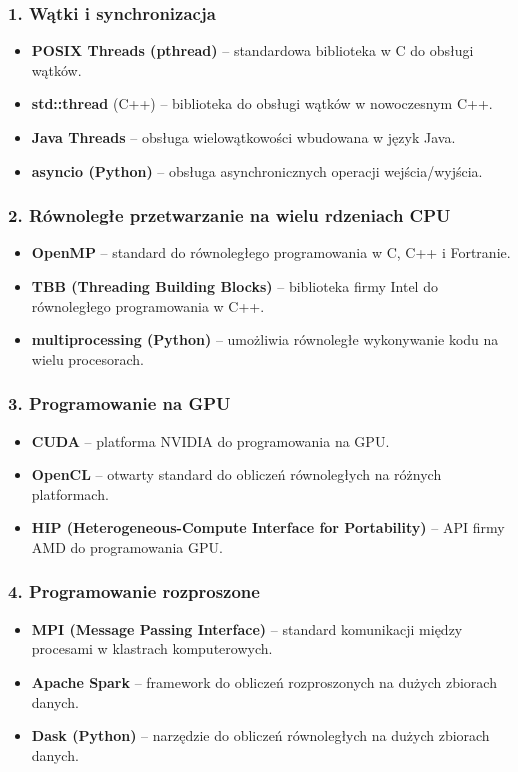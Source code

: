 \subsubsection{1. Wątki i synchronizacja}
\begin{itemize}
    \item \textbf{POSIX Threads (pthread)} – standardowa biblioteka w C do obsługi wątków.
    \item \textbf{std::thread} (C++) – biblioteka do obsługi wątków w nowoczesnym C++.
    \item \textbf{Java Threads} – obsługa wielowątkowości wbudowana w język Java.
    \item \textbf{asyncio (Python)} – obsługa asynchronicznych operacji wejścia/wyjścia.
\end{itemize}

\subsubsection{2. Równoległe przetwarzanie na wielu rdzeniach CPU}
\begin{itemize}
    \item \textbf{OpenMP} – standard do równoległego programowania w C, C++ i Fortranie.
    \item \textbf{TBB (Threading Building Blocks)} – biblioteka firmy Intel do równoległego programowania w C++.
    \item \textbf{multiprocessing (Python)} – umożliwia równoległe wykonywanie kodu na wielu procesorach.
\end{itemize}

\subsubsection{3. Programowanie na GPU}
\begin{itemize}
    \item \textbf{CUDA} – platforma NVIDIA do programowania na GPU.
    \item \textbf{OpenCL} – otwarty standard do obliczeń równoległych na różnych platformach.
    \item \textbf{HIP (Heterogeneous-Compute Interface for Portability)} – API firmy AMD do programowania GPU.
\end{itemize}

\subsubsection{4. Programowanie rozproszone}
\begin{itemize}
    \item \textbf{MPI (Message Passing Interface)} – standard komunikacji między procesami w klastrach komputerowych.
    \item \textbf{Apache Spark} – framework do obliczeń rozproszonych na dużych zbiorach danych.
    \item \textbf{Dask (Python)} – narzędzie do obliczeń równoległych na dużych zbiorach danych.
\end{itemize}


